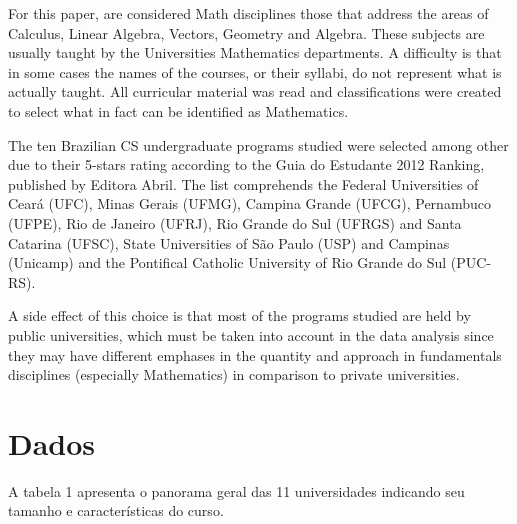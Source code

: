 \documentclass[conference]{IEEEtran}
\begin{document}
	For this paper, are considered Math disciplines those that address the areas of Calculus, Linear Algebra, Vectors, Geometry and Algebra. These subjects are usually taught by the Universities Mathematics departments. A difficulty is that in some cases the names of the courses, or their syllabi, do not represent what is actually taught. All curricular material was read and classifications were created to select what in fact can be identified as Mathematics.

	The ten Brazilian CS undergraduate programs studied were selected among other due to their 5-stars rating according to the Guia do Estudante 2012 Ranking, published by Editora Abril. \cite{guia_estudante} The list comprehends the Federal Universities of Ceará (UFC), Minas Gerais (UFMG), Campina Grande (UFCG), Pernambuco (UFPE), Rio de Janeiro (UFRJ), Rio Grande do Sul (UFRGS) and Santa Catarina (UFSC), State Universities of São Paulo (USP) and Campinas (Unicamp) and the Pontifical Catholic University of Rio Grande do Sul (PUC-RS).
	
	A side effect of this choice is that most of the programs studied are held by public universities, which must be taken into account in the data analysis since they may have different emphases in the quantity and approach in fundamentals disciplines (especially Mathematics) in comparison to private universities.
	
\section{Dados}
A tabela 1 apresenta o panorama geral das 11 universidades indicando seu tamanho e características do curso.
\end{document}
